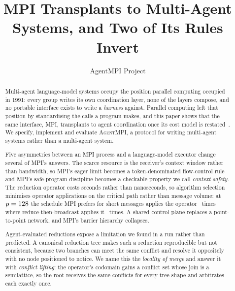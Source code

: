 \documentclass[sigconf,nonacm]{acmart}
\newcommand{\ampi}{\textsc{AgentMPI}\xspace}
\begin{document}
\title{MPI Transplants to Multi-Agent Systems, and Two of Its Rules Invert}

\author{AgentMPI Project}
\affiliation{\institution{}\country{}}

\begin{abstract}
Multi-agent language-model systems occupy the position parallel computing
occupied in 1991: every group writes its own coordination layer, none of the
layers compose, and no portable interface exists to write a \emph{harness}
against. Parallel computing left that position by standardising the calls a
program makes, and this paper shows that the same interface, MPI, transplants to
agent coordination once its cost model is
restated~\cite{mpiforum1994mpi10,mpi41}. We specify, implement and evaluate
\ampi, a protocol for writing multi-agent systems rather than a multi-agent
system.

Five asymmetries between an MPI process and a language-model executor change
several of MPI's answers. The scarce resource is the receiver's context window
rather than bandwidth, so MPI's eager limit becomes a token-denominated
flow-control rule and MPI's safe-program discipline becomes a checkable property
we call \emph{context safety}. The reduction operator costs seconds rather than
nanoseconds, so algorithm selection minimises operator applications on the
critical path rather than message volume: at $p=128$ the schedule MPI prefers
for short messages applies the operator \rdAppsonetwentyeight\ times where
reduce-then-broadcast applies it \rbAppsonetwentyeight\ times. A shared control
plane replaces a point-to-point network, and MPI's barrier hierarchy collapses.

Agent-evaluated reductions expose a limitation we found in a run rather than
predicted. A canonical reduction tree makes such a reduction reproducible but not
consistent, because two branches can meet the same conflict and resolve it
oppositely with no node positioned to notice. We name this the \emph{locality of
merge} and answer it with \emph{conflict lifting}: the operator's codomain gains a
conflict set whose join is a semilattice, so the root receives the same conflicts
for every tree shape and arbitrates each exactly once.


\end{abstract}
\end{document}
